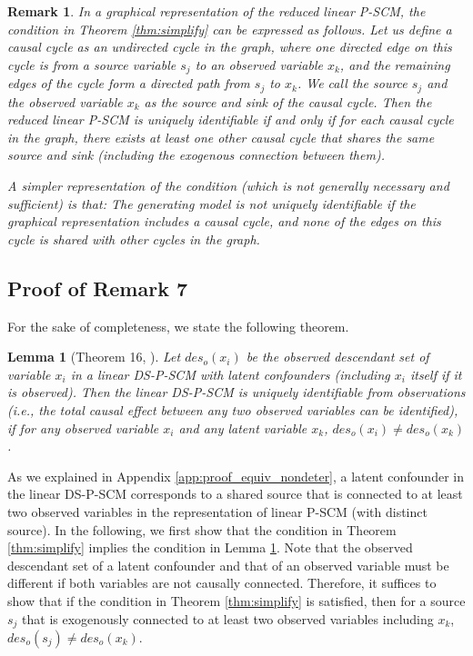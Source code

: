 \documentclass[12pt]{article}
\newtheorem{lemma}{Lemma}
\newtheorem{remark}{Remark}
\begin{document}
\begin{remark}
In a graphical representation of the reduced linear P-SCM, the condition in Theorem \ref{thm:simplify} can be expressed as follows. Let us define a causal cycle as an undirected cycle in the graph, where one directed edge on this cycle is from a source variable $s_j$ to an observed variable $x_k$, and the remaining edges of the cycle form a directed path from $s_j$ to $x_k$. We call the source $s_j$ and the observed variable $x_k$ as the source and sink of the causal cycle. Then the reduced linear P-SCM is uniquely identifiable if and only if for each causal cycle in the graph, there exists at least one other causal cycle that shares the same source and sink (including the exogenous connection between them).

A simpler representation of the condition (which is not generally necessary and sufficient) is that: The generating model is not uniquely identifiable if the graphical representation includes a causal cycle, and none of the edges on this cycle is shared with other cycles in the graph. 
\end{remark}

\subsection{Proof of Remark 7} \label{app:amirs_work} %
For the sake of completeness, we state the following theorem.
\begin{lemma} [Theorem 16, \citet{salehkaleybar2020learning}] \label{lemma:amir}
Let $des_o(x_i)$ be the observed descendant set of variable $x_i$ in a linear DS-P-SCM with latent confounders (including $x_i$ itself if it is observed). Then the linear DS-P-SCM is uniquely identifiable from observations (i.e., the total causal effect between any two observed variables can be identified), if for any observed variable $x_i$ and any latent variable $x_k$, $des_o(x_i)\neq des_o(x_k)$.
\end{lemma}

As we explained in Appendix \ref{app:proof_equiv_nondeter}, a latent confounder in the linear DS-P-SCM corresponds to a shared source that is connected to at least two observed variables in the representation of linear P-SCM (with distinct source). In the following, we first show that the condition in Theorem \ref{thm:simplify} implies the condition in Lemma \ref{lemma:amir}. Note that the observed descendant set of a latent confounder and that of an observed variable must be different if both variables are not causally connected. Therefore, it suffices to show that if the condition in Theorem \ref{thm:simplify} is satisfied, then for a source $s_j$ that is exogenously connected to at least two observed variables including $x_k$, $des_o(s_j)\neq des_o(x_k)$.
\end{document}
